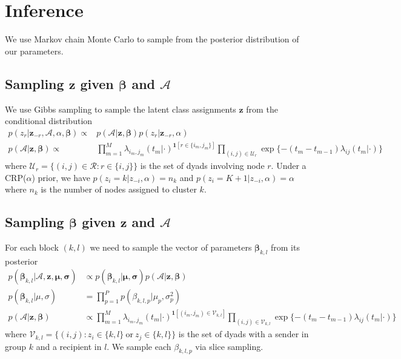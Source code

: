 \section{Inference}

We use Markov chain Monte Carlo to sample from the posterior distribution of our parameters.%

\subsection{Sampling $\mathbf{z}$ given $\boldsymbol{\beta}$ and $\mathcal{A}$ }

We use Gibbs sampling to sample the latent class assignments $\mathbf{z}$ from the conditional distribution
\begin{align*}
p(z_r | \mathbf{z}_{-r},\mathcal{A},\alpha,\boldsymbol{\beta}) \propto&  p(\mathcal{A}|\mathbf{z},\boldsymbol{\beta}) p(z_r | \mathbf{z}_{-r},\alpha) \\
p(\mathcal{A}|\mathbf{z},\boldsymbol{\beta}) \propto &
\prod_{m=1}^M \lambda_{i_m,j_m}(t_m|\cdot)^{\mathbf{1}[r \in \{i_m,j_m\}]}  \prod_{(i,j) \in \mathcal{U}_r} \exp \{ -(t_m - t_{m-1}) \lambda_{ij}(t_m|\cdot)\}
\end{align*}
where $\mathcal{U}_r = \{(i,j) \in \mathcal{R}: r \in \{i,j\}\}$ is the set of dyads involving node $r$.
Under a CRP($\alpha$) prior, we have $p(z_i = k | z_{-i},\alpha) = n_k $ and $p(z_i = K+1 |  z_{-i},\alpha) = \alpha$ where $n_k$ is the number of nodes assigned to cluster $k$.

\subsection{Sampling $\boldsymbol{\beta}$ given $\mathbf{z}$ and $\mathcal{A}$ }

For each block $(k,l)$ we need to sample the vector of parameters $\boldsymbol{\beta}_{k,l}$ from its posterior
\begin{align*}
p(\boldsymbol{\beta}_{k,l} | \mathcal{A}, \textbf{z}, \boldsymbol{\mu}, \boldsymbol{\sigma}) &\propto p(\boldsymbol{\beta}_{k,l} | \boldsymbol{\mu}, \boldsymbol{\sigma}) p( \mathcal{A}| \textbf{z}, \boldsymbol{\beta}) \\
p(\boldsymbol{\beta}_{k,l} | \mu, \sigma) &= \prod_{p=1}^Pp(\beta_{k,l,p}|\mu_p,\sigma_p^2)\\
p(\mathcal{A}|\mathbf{z},\boldsymbol{\beta}) &\propto \prod_{m=1}^M \lambda_{i_m,j_m}(t_m|\cdot)^{\mathbf{1}[(i_m,j_m) \in \mathcal{V}_{k,l}]}
\prod_{(i,j) \in \mathcal{V}_{k,l}} \exp \{ -(t_m - t_{m-1}) \lambda_{ij}(t_m|\cdot)\}
\end{align*}
where $\mathcal{V}_{k,l} = \{(i,j): z_{i} \in \{k,l\} \ \mbox{or} \ z_{j} \in \{k,l\} \}$ is the set of dyads with a sender in group $k$ and a recipient in $l$.  We sample each $\beta_{k,l,p}$ via slice sampling.

